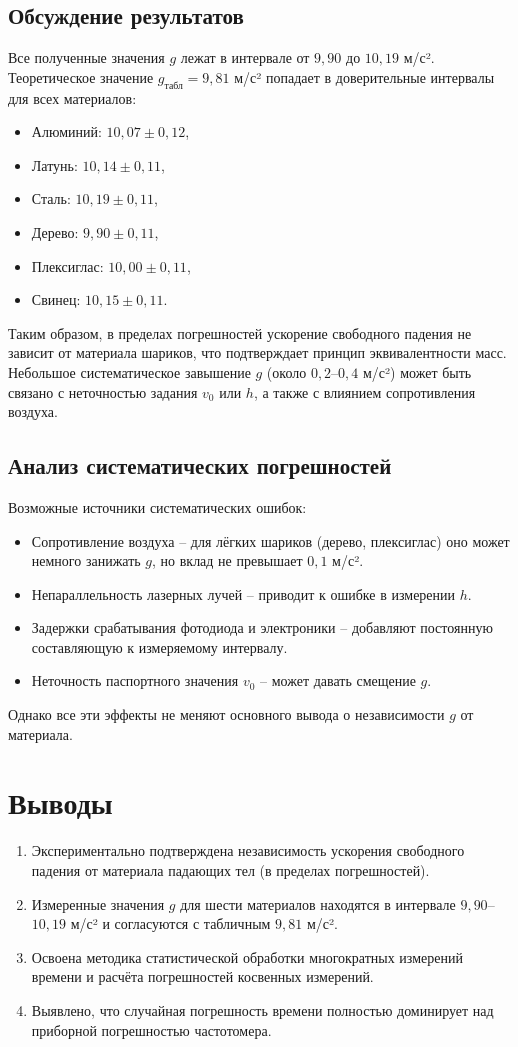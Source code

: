 \subsection{Обсуждение результатов}
Все полученные значения $g$ лежат в интервале от $9,90$ до $10,19$ м/с². Теоретическое значение $g_{\text{табл}} = 9,81$ м/с² попадает в доверительные интервалы для всех материалов: 
\begin{itemize}
    \item Алюминий: $10,07 \pm 0,12$,
    \item Латунь: $10,14 \pm 0,11$,
    \item Сталь: $10,19 \pm 0,11$,
    \item Дерево: $9,90 \pm 0,11$,
    \item Плексиглас: $10,00 \pm 0,11$,
    \item Свинец: $10,15 \pm 0,11$.
\end{itemize}
Таким образом, в пределах погрешностей ускорение свободного падения не зависит от материала шариков, что подтверждает принцип эквивалентности масс. Небольшое систематическое завышение $g$ (около $0,2$–$0,4$ м/с²) может быть связано с неточностью задания $v_0$ или $h$, а также с влиянием сопротивления воздуха.

\subsection{Анализ систематических погрешностей}
Возможные источники систематических ошибок:
\begin{itemize}
    \item Сопротивление воздуха – для лёгких шариков (дерево, плексиглас) оно может немного занижать $g$, но вклад не превышает $0,1$ м/с².
    \item Непараллельность лазерных лучей – приводит к ошибке в измерении $h$.
    \item Задержки срабатывания фотодиода и электроники – добавляют постоянную составляющую к измеряемому интервалу.
    \item Неточность паспортного значения $v_0$ – может давать смещение $g$.
\end{itemize}
Однако все эти эффекты не меняют основного вывода о независимости $g$ от материала.

\section{Выводы}
\begin{enumerate}
    \item Экспериментально подтверждена независимость ускорения свободного падения от материала падающих тел (в пределах погрешностей).
    \item Измеренные значения $g$ для шести материалов находятся в интервале $9,90$–$10,19$ м/с² и согласуются с табличным $9,81$ м/с².
    \item Освоена методика статистической обработки многократных измерений времени и расчёта погрешностей косвенных измерений.
    \item Выявлено, что случайная погрешность времени полностью доминирует над приборной погрешностью частотомера.
\end{enumerate}